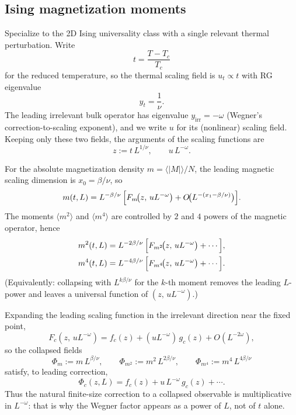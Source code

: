\documentclass[11pt]{article}
\begin{document}
\subsection{Ising magnetization moments}

Specialize to the 2D Ising universality class with a single relevant
thermal perturbation.
Write
\begin{equation}
  t = \frac{T-T_c}{T_c}
\end{equation}
for the reduced temperature, so the thermal scaling field is
$u_t \propto t$ with RG eigenvalue
\begin{equation}
  y_t = \frac{1}{\nu}.
\end{equation}
The leading irrelevant bulk operator has eigenvalue $y_{\mathrm{irr}} = -\omega$
(Wegner's correction-to-scaling exponent), and we write $u$ for its
(nonlinear) scaling field.
Keeping only these two fields, the arguments of the scaling functions are
\begin{equation}
  z := t\, L^{1/\nu},
  \qquad
  u\, L^{-\omega}.
\end{equation}

For the absolute magnetization density $m = \langle |M|\rangle / N$,
the leading magnetic scaling dimension is $x_0 = \beta/\nu$, so
\begin{equation}
  \label{eq:m-fss}
  m(t,L)
    = L^{-\beta/\nu}\,
      \Bigl[
        F_m\!\bigl(z,\, u L^{-\omega}\bigr)
        + O\!\bigl(L^{-(x_1-\beta/\nu)}\bigr)
      \Bigr].
\end{equation}
The moments $\langle m^2\rangle$ and $\langle m^4\rangle$ are controlled by
$2$ and $4$ powers of the magnetic operator, hence
\begin{align}
  \label{eq:m2-fss}
  m^2(t,L)
    &= L^{-2\beta/\nu}\,
      \Bigl[
        F_{m^2}\!\bigl(z,\, u L^{-\omega}\bigr)
        + \cdots
      \Bigr],
  \\
  \label{eq:m4-fss}
  m^4(t,L)
    &= L^{-4\beta/\nu}\,
      \Bigl[
        F_{m^4}\!\bigl(z,\, u L^{-\omega}\bigr)
        + \cdots
      \Bigr].
\end{align}
(Equivalently: collapsing with $L^{k\beta/\nu}$ for the $k$-th moment removes
the leading $L$-power and leaves a universal function of
$(z,\, u L^{-\omega})$.)

Expanding the leading scaling function in the irrelevant direction near
the fixed point,
\begin{equation}
  \label{eq:wegner-expand}
  F_c(z,\, u L^{-\omega})
    = f_c(z) + (u L^{-\omega})\, g_c(z) + O(L^{-2\omega}),
\end{equation}
so the collapsed fields
\begin{equation}
  \Phi_m := m\, L^{\beta/\nu},
  \qquad
  \Phi_{m^2} := m^2\, L^{2\beta/\nu},
  \qquad
  \Phi_{m^4} := m^4\, L^{4\beta/\nu}
\end{equation}
satisfy, to leading correction,
\begin{equation}
  \label{eq:phi-wegner}
  \Phi_c(z,L)
    = f_c(z) + u\, L^{-\omega}\, g_c(z) + \cdots.
\end{equation}
Thus the natural finite-size correction to a collapsed observable is
multiplicative in $L^{-\omega}$: that is why the Wegner factor appears as
a power of $L$, not of $t$ alone.
\end{document}
